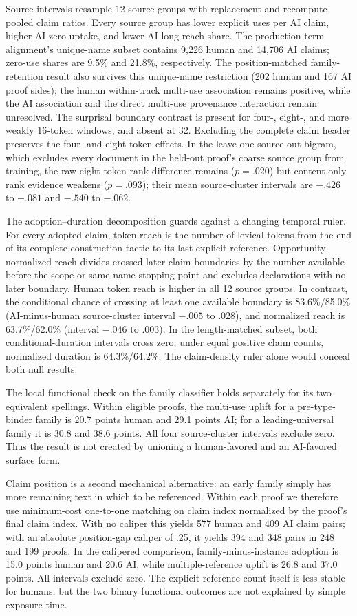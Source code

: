 \documentclass[10pt]{article}
\begin{document}
Source intervals resample 12 source groups with replacement and recompute pooled claim ratios.
Every source group has lower explicit uses per AI claim, higher AI zero-uptake, and lower AI
long-reach share.  The production term alignment's unique-name subset contains 9,226 human
and 14,706 AI claims; zero-use shares are 9.5\% and 21.8\%, respectively.
The position-matched family-retention result also survives this unique-name restriction (202 human
and 167 AI proof sides); the human within-track multi-use association remains positive, while the
AI association and the direct multi-use provenance interaction remain unresolved.
The surprisal boundary contrast is
present for four-, eight-, and more weakly 16-token windows, and absent at 32.  Excluding the complete
claim header preserves the four- and eight-token effects.  In the leave-one-source-out bigram,
which excludes every document in the held-out proof's coarse source group from training, the raw
eight-token rank difference remains ($p=.020$) but content-only rank evidence weakens ($p=.093$);
their mean source-cluster intervals are $-.426$ to $-.081$ and $-.540$ to $-.062$.

The adoption--duration decomposition guards against a changing temporal ruler.  For every adopted
claim, token reach is the number of lexical tokens from the end of its complete construction tactic to its last explicit
reference.  Opportunity-normalized reach divides crossed later claim boundaries by the number
available before the scope or same-name stopping point and excludes declarations with no later
boundary.  Human token reach is higher in all 12 source groups.  In contrast, the conditional chance
of crossing at least one available boundary is 83.6\%/85.0\% (AI-minus-human source-cluster interval
$-.005$ to $.028$), and normalized reach is 63.7\%/62.0\% (interval $-.046$ to $.003$).
In the length-matched subset, both conditional-duration intervals cross zero; under equal positive
claim counts, normalized duration is 64.3\%/64.2\%.  The claim-density ruler alone would conceal
both null results.

The local functional check on the family classifier holds separately for its two equivalent
spellings.  Within eligible proofs, the multi-use uplift for a pre-type-binder family is 20.7
points human and 29.1 points AI; for a leading-universal family it is 30.8 and 38.6 points.
All four source-cluster intervals exclude zero.  Thus the result is not created by unioning a
human-favored and an AI-favored surface form.

Claim position is a second mechanical alternative: an early family simply has more remaining text
in which to be referenced.  Within each proof we therefore use minimum-cost one-to-one matching on
claim index normalized by the proof's final claim index.  With no caliper this yields 577 human and
409 AI claim pairs; with an absolute position-gap caliper of .25, it yields 394 and 348 pairs in 248
and 199 proofs.  In the calipered comparison, family-minus-instance adoption is 15.0 points human
and 20.6 AI, while multiple-reference uplift is 26.8 and 37.0 points.  All intervals exclude zero.
The explicit-reference count itself is less stable for humans, but the two binary functional
outcomes are not explained by simple exposure time.
\end{document}
